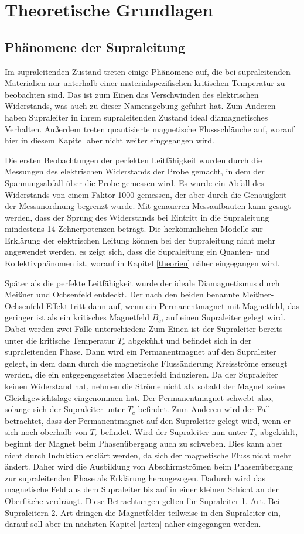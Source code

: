 \section{Theoretische Grundlagen}
\subsection{Phänomene der Supraleitung}
Im supraleitenden Zustand treten einige Phänomene auf, die bei supraleitenden Materialien nur unterhalb einer materialspezifischen kritischen Temperatur zu beobachten sind. Das ist zum Einen das Verschwinden des elektrischen Widerstands, was auch zu dieser Namensgebung geführt hat. Zum Anderen haben Supraleiter in ihrem supraleitenden Zustand ideal diamagnetisches Verhalten. Außerdem treten quantisierte magnetische Flussschläuche auf, worauf hier in diesem Kapitel aber nicht weiter eingegangen wird.

Die ersten Beobachtungen der perfekten Leitfähigkeit wurden durch die Messungen des elektrischen Widerstands der Probe gemacht, in dem der Spannungsabfall über die Probe gemessen wird. Es wurde ein Abfall des Widerstands von einem Faktor 1000 gemessen, der aber durch die Genauigkeit der Messanordnung begrenzt wurde. Mit genaueren Messaufbauten kann gesagt werden, dass der Sprung des Widerstands bei Eintritt in die Supraleitung mindestens 14 Zehnerpotenzen beträgt\cite{supraleitung}. Die herkömmlichen Modelle zur Erklärung der elektrischen Leitung können bei der Supraleitung nicht mehr angewendet werden, es zeigt sich, dass die Supraleitung ein Quanten- und Kollektivphänomen ist, worauf in Kapitel \ref{theorien} näher eingegangen wird.

Später als die perfekte Leitfähigkeit wurde der ideale Diamagnetismus durch Meißner und Ochsenfeld entdeckt. Der nach den beiden benannte Meißner-Ochsenfeld-Effekt tritt dann auf, wenn ein Permanentmagnet mit Magnetfeld, das geringer ist als ein kritisches Magnetfeld $B_c$, auf einen Supraleiter gelegt wird. Dabei werden zwei Fälle unterschieden: Zum Einen ist der Supraleiter bereits unter die kritische Temperatur $T_c$ abgekühlt und befindet sich in der supraleitenden Phase. Dann wird ein Permanentmagnet auf den Supraleiter gelegt, in dem dann durch die magnetische Flussänderung Kreisströme erzeugt werden, die ein entgegengesetztes Magnetfeld induzieren. Da der Supraleiter keinen Widerstand hat, nehmen die Ströme nicht ab, sobald der Magnet seine Gleichgewichtslage eingenommen hat. Der Permanentmagnet schwebt also, solange sich der Supraleiter unter $T_c$ befindet. Zum Anderen wird der Fall betrachtet, dass der Permanentmagnet auf den Supraleiter gelegt wird, wenn er sich noch oberhalb von $T_c$ befindet. Wird der Supraleiter nun unter $T_c$ abgekühlt, beginnt der Magnet beim Phasenübergang auch zu schweben. Dies kann aber nicht durch Induktion erklärt werden, da sich der magnetische Fluss nicht mehr ändert. Daher wird die Ausbildung von Abschirmströmen beim Phasenübergang zur supraleitenden Phase als Erklärung herangezogen. Dadurch wird das magnetische Feld aus dem Supraleiter bis auf in einer kleinen Schicht an der Oberfläche verdrängt. Diese Betrachtungen gelten für Supraleiter 1. Art. Bei Supraleitern 2. Art dringen die Magnetfelder teilweise in den Supraleiter ein, darauf soll aber im nächsten Kapitel \ref{arten} näher eingegangen werden.
